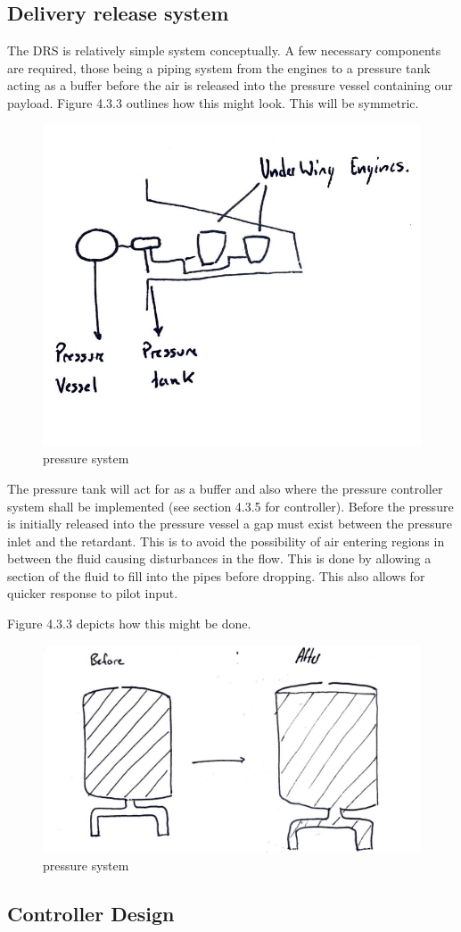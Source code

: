 \subsection{Delivery release system}

The DRS is relatively simple system conceptually. A few necessary components are required, those being a piping system from the engines to a pressure tank acting as a buffer before the air is released into the pressure vessel containing our payload. Figure 4.3.3 outlines how this might look. This will be symmetric.

\begin{figure}[!htbp]
\centering
\includegraphics[width= 0.2\linewidth]{../figures/pressure_system.jpg}
\caption{pressure system}
\label{fig:pressure_system}
\end{figure}
\FloatBarrier

The pressure tank will act for as a buffer and also where the pressure controller system shall be implemented (see section 4.3.5 for controller).
Before the pressure is initially released into the pressure vessel a gap must exist between the pressure inlet and the retardant. This is to avoid the possibility of air entering regions in between the fluid causing disturbances in the flow. This is done by allowing a section of the fluid to fill into the pipes before dropping. This also allows for quicker response to pilot input.

Figure 4.3.3 depicts how this might be done. 

\begin{figure}[!htbp]
\centering
\includegraphics[width= 0.2\linewidth]{../figures/release_system_fluid_placement_control.jpg}
\caption{pressure system}
\label{fig:pressure_system}
\end{figure}
\FloatBarrier

\subsection{Controller Design}

